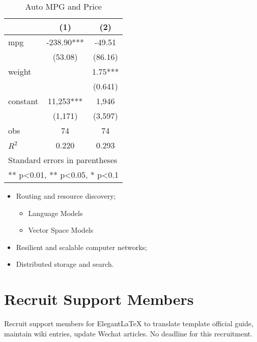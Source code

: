 \documentclass[en,hazy,screen,blue,14pt]{elegantnote}
\begin{document}
\begin{table}[htbp]
  \small
  \centering
  \caption{Auto MPG and Price \label{tab:reg}}
    \begin{tabular}{lcc}
    \toprule
                    &       (1)         &        (2)      \\
    \midrule
    mpg             &    -238.90***     &      -49.51     \\
                    &     (53.08)       &      (86.16)    \\
    weight          &                   &      1.75***    \\
                    &                   &      (0.641)    \\
    constant        &     11,253***     &       1,946     \\
                    &     (1,171)       &      (3,597)   \\
    obs             &        74         &         74     \\
    $R^2$           &      0.220        &       0.293    \\
    \bottomrule
    \multicolumn{3}{l}{\scriptsize Standard errors in parentheses} \\
    \multicolumn{3}{l}{\scriptsize *** p<0.01, ** p<0.05, * p<0.1} \\
    \end{tabular}%
\end{table}%


\begin{itemize}[noitemsep]
  \item Routing and resource discovery;
    \begin{itemize} 
      \item Language Models
      \item Vector Space Models
    \end{itemize}
  \item Resilient and scalable computer networks;
  \item Distributed storage and search.
\end{itemize}


\section{Recruit Support Members}

Recruit support members for Elegant\LaTeX{} to translate template official guide, maintain wiki entries, update Wechat articles. No deadline for this recruitment.
\end{document}
